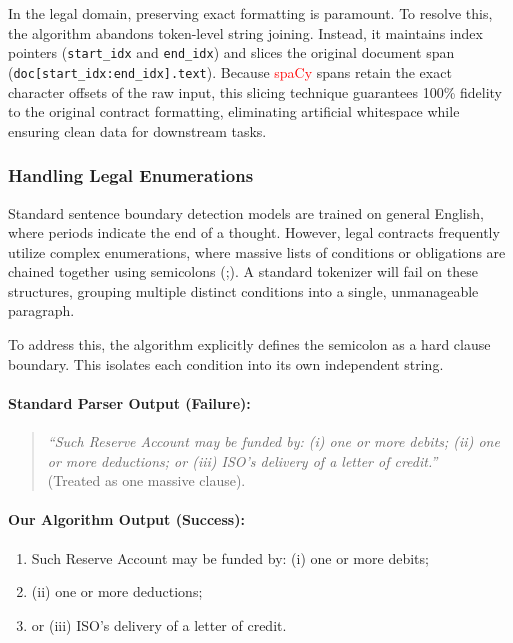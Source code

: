 \documentclass[twoside,final]{hcmut-report}
\begin{document}
\medskip

In the legal domain, preserving exact formatting is paramount. To resolve this, the algorithm abandons token-level string joining. Instead, it maintains index pointers (\verb|start_idx| and \verb|end_idx|) and slices the original document span (\verb|doc[start_idx:end_idx].text|). Because \textcolor{red}{\textcolor{red}{\textcolor{red}{spaCy}}} spans retain the exact character offsets of the raw input, this slicing technique guarantees 100\% fidelity to the original contract formatting, eliminating artificial whitespace while ensuring clean data for downstream tasks.
\subsubsection*{Handling Legal Enumerations}
Standard sentence boundary detection models are trained on general English, where periods indicate the end of a thought. However, legal contracts frequently utilize complex enumerations, where massive lists of conditions or obligations are chained together using semicolons (;). A standard tokenizer will fail on these structures, grouping multiple distinct conditions into a single, unmanageable paragraph.

\medskip

To address this, the algorithm explicitly defines the semicolon as a hard clause boundary. This isolates each condition into its own independent string.

\paragraph{Standard Parser Output (Failure):}
\begin{quote}
  \textit{``Such Reserve Account may be funded by: (i) one or more debits; (ii) one or more deductions; or (iii) ISO's delivery of a letter of credit.''}\\(Treated as one massive clause).
\end{quote}

\paragraph{Our Algorithm Output (Success):}
\begin{enumerate}[label=\textit{Clause \arabic*.}]
  \item Such Reserve Account may be funded by: (i) one or more debits;
  \item (ii) one or more deductions;
  \item or (iii) ISO's delivery of a letter of credit.
\end{enumerate}
\end{document}
